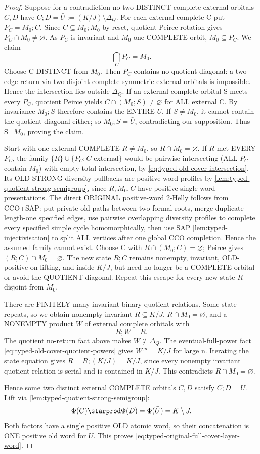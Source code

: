 \begin{proof}
Suppose for a contradiction no two
DISTINCT complete external orbitals
$C,D$ have $C;D=\bar U:=(K/J)\setminus\Delta_Q$.
For each external complete C put
$P_C=M_0;C$. Since
$C\subseteq M_0;M_0$ by reset,
quotient Peirce rotation gives
$P_C\cap M_0\ne\varnothing$.
As $P_C$ is invariant and $M_0$
one COMPLETE orbit, $M_0\subseteq P_C$.
We claim
\[
                          \bigcap_C P_C=M_0.
\tag{OWL-I}\label{eq:typed-old-cover-intersection}
\]
Choose C DISTINCT from $M_0$.
Then $P_C$ contains no quotient
diagonal: a two-edge return via
two disjoint complete symmetric
external orbitals is impossible.
Hence the intersection lies
outside $\Delta_Q$.
If an external complete orbital S
meets every $P_C$, quotient
Peirce yields $C\cap(M_0;S)\ne
\varnothing$ for ALL external C.
By invariance $M_0;S$ therefore
contains the ENTIRE $\bar U$.
If $S\ne M_0$, it cannot contain
the quotient diagonal either;
so $M_0;S=\bar U$, contradicting
our supposition. Thus S=$M_0$,
proving the claim.

Start with one external COMPLETE
$R\ne M_0$, so $R\cap M_0=\varnothing$.
If $R$ met EVERY $P_C$, the
family $\{R\}\cup\{P_C:C\text{ external}\}$
would be pairwise intersecting
(ALL $P_C$ contain $M_0$)
with empty total intersection,
by \eqref{eq:typed-old-cover-intersection}.
Its OLD STRONG diversity pullbacks
are positive word profiles by
\cref{lem:typed-quotient-strong-semigroup},
since $R,M_0,C$ have positive
single-word presentations.
The direct ORIGINAL positive-word
2-Helly follows from CCO+SAP:
put private old paths between two
formal roots, merge duplicate
length-one specified edges,
use pairwise overlapping diversity
profiles to complete every
specified simple cycle homomorphically,
then use SAP
\cref{lem:typed-injectivisation}
to split ALL vertices after one
global CCO completion. Hence
the assumed family cannot exist.
Choose C with $R\cap(M_0;C)=\varnothing$;
Peirce gives $(R;C)\cap M_0=\varnothing$.
The new state $R;C$ remains nonempty,
invariant, OLD-positive on lifting,
and inside $K/J$, but need no
longer be a COMPLETE orbital or
avoid the QUOTIENT diagonal.
Repeat this escape for every new state
$R$ disjoint from $M_0$.

There are FINITELY many invariant
binary quotient relations. Some state
repeats, so we obtain nonempty
invariant $R\subseteq K/J$,
$R\cap M_0=\varnothing$, and a
NONEMPTY product $W$ of external
complete orbitals with
\[
                           R;W=R.
\]
The quotient no-return fact above
makes $W\not\subseteq\Delta_Q$.
The eventual-full-power fact
\eqref{eq:typed-old-cover-quotient-powers}
gives $W^{;n}=K/J$ for large n.
Iterating the state equation gives
$R=R;(K/J)=K/J$, since every
nonempty invariant quotient relation
is serial and is contained in $K/J$.
This contradicts $R\cap M_0=\varnothing$.

Hence some two distinct external
COMPLETE orbitals $C,D$ satisfy
$C;D=\bar U$. Lift via
\cref{lem:typed-quotient-strong-semigroup}:
\[
             \Phi(C)\starprod\Phi(D)
                =\Phi(\bar U)=K\setminus J.
\]
Both factors have a single positive
OLD atomic word, so their concatenation
is ONE positive old word for $U$.
This proves \eqref{eq:typed-original-full-cover-layer-word}.
\end{proof}

